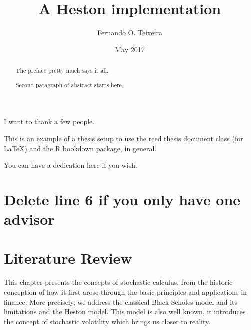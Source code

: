 \documentclass[12pt,twoside]{reedthesis}
\title{A Heston implementation}
\author{Fernando O. Teixeira}
\date{May 2017}
\theoremstyle{definition}
\theoremstyle{definition}
\theoremstyle{remark}
\begin{document}
      \maketitle
  
  \frontmatter %
  \pagestyle{empty} %

      \begin{acknowledgements}
      I want to thank a few people.
    \end{acknowledgements}
  
      \begin{preface}
      This is an example of a thesis setup to use the reed thesis document
      class (for LaTeX) and the R bookdown package, in general.
    \end{preface}
  
      \hypersetup{linkcolor=black}
    \setcounter{tocdepth}{2}
    \tableofcontents
  
      \listoftables
  
      \listoffigures
  
      \begin{abstract}
      The preface pretty much says it all. \par  Second paragraph of abstract
      starts here.
    \end{abstract}
  
      \begin{dedication}
      You can have a dedication here if you wish.
    \end{dedication}
  
  \mainmatter %
  \pagestyle{fancyplain} %

  \chapter{Delete line 6 if you only have one
  advisor}\label{delete-line-6-if-you-only-have-one-advisor}
  
  \chapter{Literature Review}\label{lt-review}
  
  This chapter presents the concepts of stochastic calculus, from the
  historic conception of how it first arose through the basic principles
  and applications in finance. More precisely, we address the classical
  Black-Scholes model and its limitations and the Heston model. This model
  is also well known, it introduces the concept of stochastic volatility
  which brings us closer to reality.
  
\end{document}

